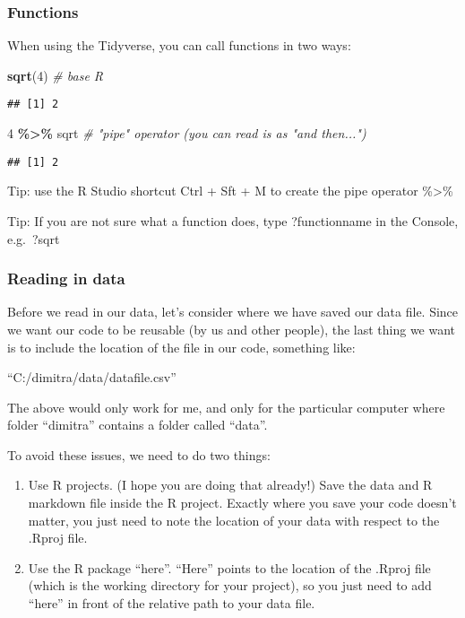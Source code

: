 \documentclass[
]{article}
\newenvironment{Shaded}{\begin{snugshade}}{\end{snugshade}}
\newcommand{\CommentTok}[1]{\textcolor[rgb]{0.56,0.35,0.01}{\textit{#1}}}
\newcommand{\DecValTok}[1]{\textcolor[rgb]{0.00,0.00,0.81}{#1}}
\newcommand{\FunctionTok}[1]{\textcolor[rgb]{0.13,0.29,0.53}{\textbf{#1}}}
\newcommand{\NormalTok}[1]{#1}
\newcommand{\SpecialCharTok}[1]{\textcolor[rgb]{0.81,0.36,0.00}{\textbf{#1}}}
\providecommand{\tightlist}{%
  \setlength{\itemsep}{0pt}\setlength{\parskip}{0pt}}
\begin{document}
\subsubsection{Functions}\label{functions}

When using the Tidyverse, you can call functions in two ways:

\begin{Shaded}
\begin{Highlighting}[]
\FunctionTok{sqrt}\NormalTok{(}\DecValTok{4}\NormalTok{) }\CommentTok{\# base R}
\end{Highlighting}
\end{Shaded}

\begin{verbatim}
## [1] 2
\end{verbatim}

\begin{Shaded}
\begin{Highlighting}[]
\DecValTok{4} \SpecialCharTok{\%\textgreater{}\%}
\NormalTok{  sqrt  }\CommentTok{\# "pipe" operator (you can read is as "and then...")}
\end{Highlighting}
\end{Shaded}

\begin{verbatim}
## [1] 2
\end{verbatim}

Tip: use the R Studio shortcut Ctrl + Sft + M to create the pipe
operator \%\textgreater\%

Tip: If you are not sure what a function does, type ?functionname in the
Console, e.g.~?sqrt

\subsubsection{Reading in data}\label{reading-in-data}

Before we read in our data, let's consider where we have saved our data
file. Since we want our code to be reusable (by us and other people),
the last thing we want is to include the location of the file in our
code, something like:

``C:/dimitra/data/datafile.csv''

The above would only work for me, and only for the particular computer
where folder ``dimitra'' contains a folder called ``data''.

To avoid these issues, we need to do two things:

\begin{enumerate}
\def\labelenumi{\arabic{enumi}.}
\tightlist
\item
  Use R projects. (I hope you are doing that already!) Save the data and
  R markdown file inside the R project. Exactly where you save your code
  doesn't matter, you just need to note the location of your data with
  respect to the .Rproj file.
\item
  Use the R package ``here''. ``Here'' points to the location of the
  .Rproj file (which is the working directory for your project), so you
  just need to add ``here'' in front of the relative path to your data
  file.
\end{enumerate}
\end{document}

